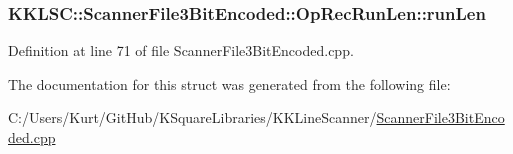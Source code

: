 \subsubsection[{\texorpdfstring{run\+Len}{runLen}}]{ K\+K\+L\+S\+C\+::\+Scanner\+File3\+Bit\+Encoded\+::\+Op\+Rec\+Run\+Len\+::run\+Len}\hypertarget{struct_scanner_file3_bit_encoded_1_1_op_rec_run_len_acd89faea423081d77b449a68c289b8d8}{}\label{struct_scanner_file3_bit_encoded_1_1_op_rec_run_len_acd89faea423081d77b449a68c289b8d8}


Definition at line 71 of file Scanner\+File3\+Bit\+Encoded.\+cpp.



The documentation for this struct was generated from the following file\+:\begin{DoxyCompactItemize}
\item 
C\+:/\+Users/\+Kurt/\+Git\+Hub/\+K\+Square\+Libraries/\+K\+K\+Line\+Scanner/\hyperlink{_scanner_file3_bit_encoded_8cpp}{Scanner\+File3\+Bit\+Encoded.\+cpp}\end{DoxyCompactItemize}
